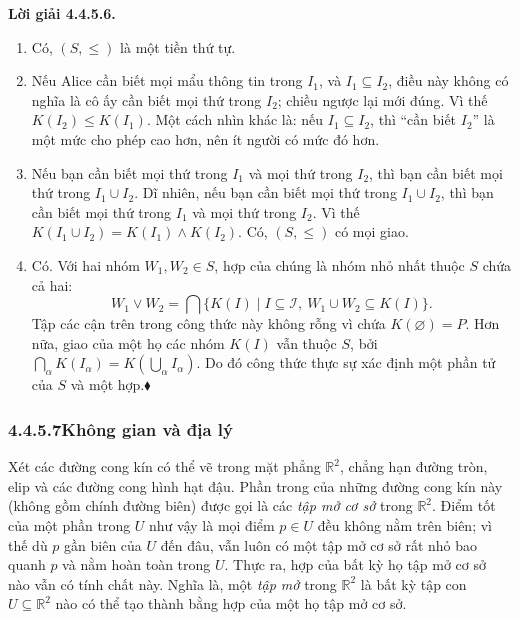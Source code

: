 \noindent\textbf{Lời giải 4.4.5.6.}\keepwithnext
\begin{enumerate}[label=\alph*.]
\item Có, $(S,\le)$ là một tiền thứ tự.
\item Nếu Alice cần biết mọi mẩu thông tin trong $I_1$, và $I_1\subseteq I_2$, điều này không có nghĩa là cô ấy cần biết mọi thứ trong $I_2$; chiều ngược lại mới đúng. Vì thế $K(I_2)\le K(I_1)$. Một cách nhìn khác là: nếu $I_1\subseteq I_2$, thì ``cần biết $I_2$'' là một mức cho phép cao hơn, nên ít người có mức đó hơn.
\item Nếu bạn cần biết mọi thứ trong $I_1$ và mọi thứ trong $I_2$, thì bạn cần biết mọi thứ trong $I_1\cup I_2$. Dĩ nhiên, nếu bạn cần biết mọi thứ trong $I_1\cup I_2$, thì bạn cần biết mọi thứ trong $I_1$ và mọi thứ trong $I_2$. Vì thế $K(I_1\cup I_2)=K(I_1)\wedge K(I_2)$. Có, $(S,\le)$ có mọi giao.
\item Có. Với hai nhóm $W_1,W_2\in S$, hợp của chúng là nhóm nhỏ nhất thuộc $S$ chứa cả hai:
\[
W_1\vee W_2=\bigcap\{K(I)\mid I\subseteq\mathcal I,\ W_1\cup W_2\subseteq K(I)\}.
\]
Tập các cận trên trong công thức này không rỗng vì chứa $K(\varnothing)=P$. Hơn nữa, giao của một họ các nhóm $K(I)$ vẫn thuộc $S$, bởi $\bigcap_\alpha K(I_\alpha)=K(\bigcup_\alpha I_\alpha)$. Do đó công thức thực sự xác định một phần tử của $S$ và một hợp.\nobreak\hfill$\blacklozenge$
\end{enumerate}

\subsubsection*{4.4.5.7\quad Không gian và địa lý}

Xét các đường cong kín có thể vẽ trong mặt phẳng $\mathbb R^2$, chẳng hạn đường tròn, elip và các đường cong hình hạt đậu. Phần trong của những đường cong kín này (không gồm chính đường biên) được gọi là các \emph{tập mở cơ sở} trong $\mathbb R^2$. Điểm tốt của một phần trong $U$ như vậy là mọi điểm $p\in U$ đều không nằm trên biên; vì thế dù $p$ gần biên của $U$ đến đâu, vẫn luôn có một tập mở cơ sở rất nhỏ bao quanh $p$ và nằm hoàn toàn trong $U$. Thực ra, hợp của bất kỳ họ tập mở cơ sở nào vẫn có tính chất này. Nghĩa là, một \emph{tập mở} trong $\mathbb R^2$ là bất kỳ tập con $U\subseteq\mathbb R^2$ nào có thể tạo thành bằng hợp của một họ tập mở cơ sở.

